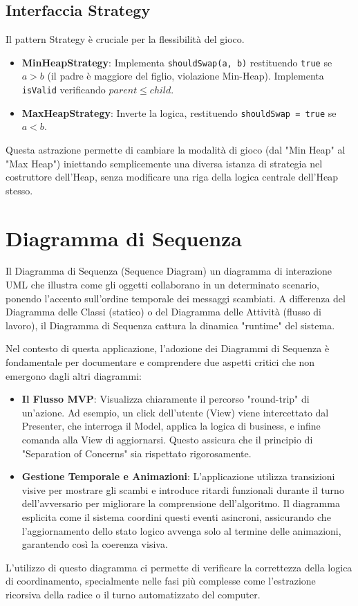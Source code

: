 \documentclass[openany]{theme/uniprthesis}
\begin{document}
\subsection{Interfaccia Strategy}
Il pattern Strategy è cruciale per la flessibilità del gioco.
\begin{itemize}
    \item \textbf{MinHeapStrategy}: Implementa \texttt{shouldSwap(a, b)} restituendo \texttt{true} se $a > b$ (il padre è maggiore del figlio, violazione Min-Heap). Implementa \texttt{isValid} verificando $parent \leq child$.
    \item \textbf{MaxHeapStrategy}: Inverte la logica, restituendo \texttt{shouldSwap = true} se $a < b$.
\end{itemize}
Questa astrazione permette di cambiare la modalità di gioco (dal "Min Heap" al "Max Heap") iniettando semplicemente una diversa istanza di strategia nel costruttore dell'Heap, senza modificare una riga della logica centrale dell'Heap stesso.

\section{Diagramma di Sequenza}
Il Diagramma di Sequenza (Sequence Diagram)  un diagramma di interazione UML che illustra come gli oggetti collaborano in un determinato scenario, ponendo l'accento sull'ordine temporale dei messaggi scambiati. A differenza del Diagramma delle Classi (statico) o del Diagramma delle Attività (flusso di lavoro), il Diagramma di Sequenza cattura la dinamica "runtime" del sistema.

Nel contesto di questa applicazione, l'adozione dei Diagrammi di Sequenza è fondamentale per documentare e comprendere due aspetti critici che non emergono dagli altri diagrammi:
\begin{itemize}
    \item \textbf{Il Flusso MVP}: Visualizza chiaramente il percorso "round-trip" di un'azione. Ad esempio, un click dell'utente (View) viene intercettato dal Presenter, che interroga il Model, applica la logica di business, e infine comanda alla View di aggiornarsi. Questo assicura che il principio di "Separation of Concerns" sia rispettato rigorosamente.
    \item \textbf{Gestione Temporale e Animazioni}: L'applicazione utilizza transizioni visive per mostrare gli scambi e introduce ritardi funzionali durante il turno dell'avversario per migliorare la comprensione dell'algoritmo. Il diagramma esplicita come il sistema coordini questi eventi asincroni, assicurando che l'aggiornamento dello stato logico avvenga solo al termine delle animazioni, garantendo così la coerenza visiva.
\end{itemize}
L'utilizzo di questo diagramma ci permette di verificare la correttezza della logica di coordinamento, specialmente nelle fasi più complesse come l'estrazione ricorsiva della radice o il turno automatizzato del computer.
\end{document}
